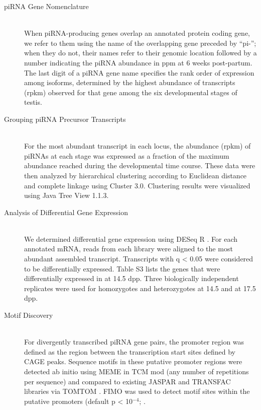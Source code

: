 \begin{description}
    \item[piRNA Gene Nomenclature] \hfill \\
    When piRNA-producing genes overlap an annotated protein coding gene, we refer to them using the name of the overlapping gene preceded by ``pi-''; when they do not, their names refer to their genomic location followed by a number indicating the piRNA abundance in ppm at 6 weeks post-partum. The last digit of a piRNA gene name specifies the rank order of expression among isoforms, determined by the highest abundance of transcripts (rpkm) observed for that gene among the six developmental stages of testis.

    \item[Grouping piRNA Precursor Transcripts] \hfill \\
    For the most abundant transcript in each locus, the abundance (rpkm) of piRNAs at each stage was expressed as a fraction of the maximum abundance reached during the developmental time course. These data were then analyzed by hierarchical clustering according to Euclidean distance and complete linkage using Cluster 3.0. Clustering results were visualized using Java Tree View 1.1.3.

    \item[Analysis of Differential Gene Expression ] \hfill \\
    We determined differential gene expression using DESeq R \citep{Anders2010a}. For each annotated mRNA, reads from each library were aligned to the most abundant assembled transcript. Transcripts with q < 0.05 were considered to be differentially expressed. Table S3 lists the genes that were differentially expressed in \amyb{} at 14.5 dpp. Three biologically independent replicates were used for \amyb homozygotes and heterozygotes at 14.5 and at 17.5 dpp.

    \item[Motif Discovery] \hfill \\
    For divergently transcribed piRNA gene pairs, the promoter region was defined as the region between the transcription start sites defined by CAGE peaks. Sequence motifs in these putative promoter regions were detected ab initio using MEME \citep{Bailey1994, Bailey2009} in TCM mod (any number of repetitions per sequence) and compared to existing JASPAR and TRANSFAC libraries via TOMTOM \citep{Gupta2007}. FIMO was used to detect motif sites within the putative promoters (default p < 10$^{-4}$; \citep{Grant2011}.


\end{description}
